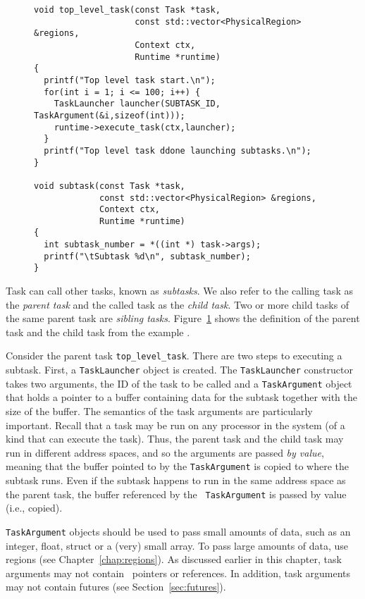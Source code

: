 \begin{figure}
\begin{lstlisting}
void top_level_task(const Task *task,
                    const std::vector<PhysicalRegion> &regions,
                    Context ctx, 
                    Runtime *runtime)
{
  printf("Top level task start.\n");
  for(int i = 1; i <= 100; i++) {
    TaskLauncher launcher(SUBTASK_ID, TaskArgument(&i,sizeof(int)));
    runtime->execute_task(ctx,launcher);
  }
  printf("Top level task ddone launching subtasks.\n");
}

void subtask(const Task *task,
             const std::vector<PhysicalRegion> &regions,
             Context ctx,
             Runtime *runtime)
{
  int subtask_number = *((int *) task->args);
  printf("\tSubtask %d\n", subtask_number);
}
\end{lstlisting}
\caption{}
\label{fig:subtask}
\end{figure}



Task can call other tasks, known as {\em subtasks}.  We also refer to
the calling task as the {\em parent task} and the called task as the
{\em child task}.  Two or more child tasks of the same parent task are
{\em sibling tasks}.  Figure~\ref{fig:subtask} shows the definition of
the parent task and the child task from the example
.

Consider the parent task {\tt top\_level\_task}.  There are two steps
to executing a subtask.  First, a {\tt TaskLauncher} object is
created.  The {\tt TaskLauncher}
constructor takes two arguments, the ID of the task to be called and a
{\tt TaskArgument} object that holds a pointer to a buffer containing
data for the subtask together with the size of the buffer.  The
semantics of the task arguments are particularly important.  Recall
that a task may be run on any processor in the system (of a kind that
can execute the task).  Thus, the parent task and the child task may
run in different address spaces, and so the arguments are passed
{\em by value}, meaning that the buffer pointed to by the {\tt TaskArgument} is
copied to where the subtask runs.  Even if the subtask happens to run in the
same address space as the parent task, the buffer referenced by the {\tt
  TaskArgument} is passed by value (i.e., copied).  

{\tt TaskArgument} objects should be used to pass small amounts of data,
such as an integer, float, struct or a (very) small array.  To pass large amounts of
data, use regions (see Chapter~\ref{chap:regions}).  As
discussed earlier in this chapter, task arguments may not contain
\Cpp\ pointers or references.  In addition, task arguments may not contain
futures (see Section~\ref{sec:futures}).


